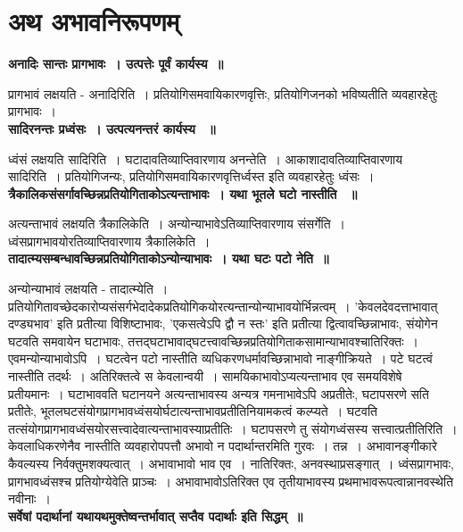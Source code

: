 \section*{अथ अभावनिरूपणम्}
	{\bfseries अनादिः सान्तः प्रागभावः~। उत्पत्तेः पूर्वं कार्यस्य~॥}\par
		प्रागभावं लक्षयति - अनादिरिति~। प्रतियोगिसमवायिकारणवृत्तिः, प्रतियोगिजनको भविष्यतीति व्यवहारहेतुः प्रागभावः~।\\[10pt]
	{\bfseries सादिरनन्तः प्रध्वंसः~। उत्पत्यनन्तरं कार्यस्य ~॥}\par
		ध्वंसं लक्षयति सादिरिति~। घटादावतिव्याप्तिवारणाय अनन्तेति~। आकाशादावतिव्याप्तिवारणाय सादिरिति~। प्रतियोगिजन्यः, प्रतियोगिसमवायिकारणवृत्तिर्ध्वस्त इति व्यवहारहेतुः ध्वंसः~।\\[10pt]
	{\bfseries त्रैकालिकसंसर्गावच्छिन्नप्रतियोगिताकोऽत्यन्ताभावः~। यथा भूतले घटो नास्तीति ~॥}\par
		अत्यन्ताभावं लक्षयति त्रैकालिकेति~। अन्योन्याभावेऽतिव्याप्तिवारणाय संसर्गेति~। ध्वंसप्रागभावयोरतिव्याप्तिवारणाय त्रैकालिकेति~।\\[10pt]
	{\bfseries तादात्म्यसम्बन्धावच्छिन्नप्रतियोगिताकोऽन्योन्याभावः~। यथा घटः पटो नेति~॥}\par
		अन्योन्याभावं लक्षयति - तादात्म्येति~। प्रतियोगितावच्छेदकारोप्यसंसर्गभेदादेकप्रतियोगिकयोरत्यन्तान्योन्याभावयोर्भिन्नत्वम्~। 'केवलदेवदत्ताभावात् दण्ड्यभाव' इति प्रतीत्या विशिष्टाभावः, ’एकसत्वेऽपि द्वौ न स्तः’ इति प्रतीत्या द्वित्वावच्छिन्नाभावः, संयोगेन घटवति समवायेन घटाभावः, तत्तद्घटाभावाद्घटत्त्वावच्छिन्नप्रतियोगिताकसामान्याभावश्चातिरिक्तः~। एवमन्योन्याभावोऽपि~। घटत्वेन पटो नास्तीति व्यधिकरणधर्मावच्छिन्नाभावो नाङ्गीक्रियते~। पटे घटत्वं नास्तीति तदर्थः~। अतिरिक्तत्वे स केवलान्वयी~। सामयिकाभावोऽप्यत्यन्ताभाव एव समयविशेषे प्रतीयमानः~। घटाभाववति घटानयने अत्यन्ताभावस्य अन्यत्र गमनाभावेऽपि अप्रतीतेः, घटापसरणे सति प्रतीतेः, भूतलघटसंयोगप्रागभावध्वंसयोर्घटात्यन्ताभावप्रतीतिनियामकत्वं कल्प्यते~। घटवति तत्संयोगप्रागभावध्वंसयोरसत्त्वादेवात्यन्ताभावस्याप्रतीतिः~। घटापसरणे तु संयोगध्वंसस्य सत्त्वात्प्रतीतिरिति~। केवलाधिकरणेनैव नास्तीति व्यवहारोपपत्तौ अभावो न पदार्थान्तरमिति गुरवः~। तन्न~। अभावानङ्गीकारे कैवल्यस्य निर्वक्तुमशक्यत्वात्~। अभावाभावो भाव एव~। नातिरिक्तः, अनवस्थाप्रसङ्गात्~। ध्वंसप्रागभावः, प्रागभावध्वंसश्च प्रतियोग्येवेति प्राञ्चः~। अभावाभावोऽतिरिक्त एव तृतीयाभावस्य प्रथमाभावरूपत्वान्नानवस्थेति नवीनाः~।\\[10pt]
	{\bfseries सर्वेषां पदार्थानां यथायथमुक्तेष्वन्तर्भावात् सप्तैव पदार्थाः इति सिद्धम्~॥}\par
